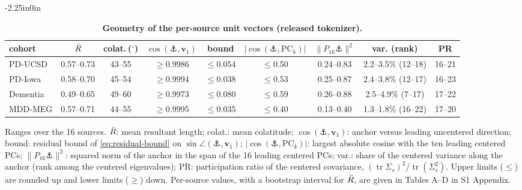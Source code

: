 \begin{table}[!ht]
\begin{adjustwidth}{-2.25in}{0in}
\renewcommand{\baselinestretch}{1}
\caption{{\bf Geometry of the per-source unit vectors (released tokenizer).}}
\label{tab:geometry}
\centering\scriptsize
\setlength{\tabcolsep}{2.6pt}
\begin{tabular}{@{}lcccccccc@{}}
\toprule
\textbf{cohort} & $\bar{R}$ & \textbf{colat.}\,($^\circ$) & $\cos(\anchor,\bm{v}_1)$ & \textbf{bound} & $|\cos(\anchor,\mathrm{PC}_k)|$ & $\|P_{16}\anchor\|^2$ & \textbf{var.} (\textbf{rank}) & \textbf{PR} \\
\midrule
PD-UCSD & 0.57--0.73 & 43--55 & $\geq$0.9986 & $\leq$0.054 & $\leq$0.50 & 0.24--0.83 & 2.2--3.5\% (12--18) & 16--21 \\
PD-Iowa & 0.58--0.70 & 45--54 & $\geq$0.9994 & $\leq$0.038 & $\leq$0.53 & 0.25--0.87 & 2.4--3.8\% (12--17) & 16--23 \\
Dementia & 0.49--0.65 & 49--60 & $\geq$0.9973 & $\leq$0.080 & $\leq$0.59 & 0.26--0.88 & 2.5--4.9\% (7--17) & 17--22 \\
MDD-MEG & 0.57--0.71 & 44--55 & $\geq$0.9995 & $\leq$0.035 & $\leq$0.40 & 0.13--0.40 & 1.3--1.8\% (16--22) & 17--20 \\
\bottomrule
\end{tabular}
\begin{flushleft}\footnotesize Ranges over the 16 sources. $\bar{R}$: mean resultant length; colat.: mean colatitude; $\cos(\anchor,\bm{v}_1)$: anchor versus leading uncentered direction; bound: residual bound of \cref{eq:residual-bound} on $\sin\angle(\anchor,\bm{v}_1)$; $|\cos(\anchor,\mathrm{PC}_k)|$: largest absolute cosine with the ten leading centered PCs; $\|P_{16}\anchor\|^2$: squared norm of the anchor in the span of the 16 leading centered PCs; var.: share of the centered variance along the anchor (rank among the centered eigenvalues); PR: participation ratio of the centered covariance, $(\operatorname{tr}\Sigma_s)^2/\operatorname{tr}(\Sigma_s^2)$. Upper limits ($\leq$) are rounded up and lower limits ($\geq$) down. Per-source values, with a bootstrap interval for $\bar{R}$, are given in Tables A--D in S1 Appendix.\end{flushleft}
\end{adjustwidth}
\end{table}
